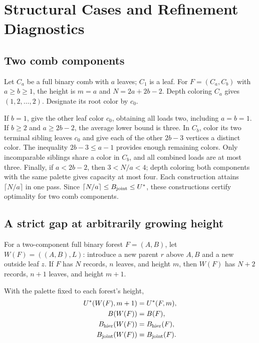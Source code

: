 \section{Structural Cases and Refinement Diagnostics}
\label{sec:scoped-sufficiency}

\subsection{Two comb components}
Let $C_a$ be a full binary comb with $a$ leaves; $C_1$ is a leaf.
For $F=(C_a,C_b)$ with $a\ge b\ge1$, the height is $m=a$ and
$N=2a+2b-2$. Depth coloring $C_a$ gives $(1,2,\ldots,2)$.
Designate its root color by $c_0$.

If $b=1$, give the other leaf color $c_0$, obtaining all loads two,
including $a=b=1$. If $b\ge2$ and $a\ge2b-2$, the average lower bound
is three. In $C_b$, color its two terminal sibling leaves $c_0$ and
give each of the other $2b-3$ vertices a distinct color. The inequality
$2b-3\le a-1$ provides enough remaining colors. Only incomparable
siblings share a color in $C_b$, and all combined loads are at most
three. Finally, if $a<2b-2$, then $3<N/a<4$; depth coloring both
components with the same palette gives capacity at most four.
Each construction attains $\lceil N/a\rceil$ in one pass. Since
$\lceil N/a\rceil\le B_{\rm joint}\le U^*$, these constructions certify
optimality for two comb components.

\subsection{A strict gap at arbitrarily growing height}
\label{sec:wrapper-strictness}
For a two-component full binary forest $F=(A,B)$, let
$W(F)=((A,B),L)$: introduce a new parent $r$ above $A,B$ and a new
outside leaf $z$. If $F$ has $N$ records, $n$ leaves, and height $m$,
then $W(F)$ has $N+2$ records, $n+1$ leaves, and height $m+1$.

\begin{proposition}
\label{prop:supp-wrapper-invariance}
With the palette fixed to each forest's height,
\begin{align}
 U^*(W(F),m+1)&=U^*(F,m),\label{eq:supp-wrapper-optimum}\\
 B(W(F))&=B(F),\label{eq:supp-wrapper-average}\\
 B_{\rm hier}(W(F))&=B_{\rm hier}(F),
 \label{eq:supp-wrapper-individual}\\
 B_{\rm joint}(W(F))&=B_{\rm joint}(F).
 \label{eq:supp-wrapper-joint}
\end{align}
\end{proposition}

